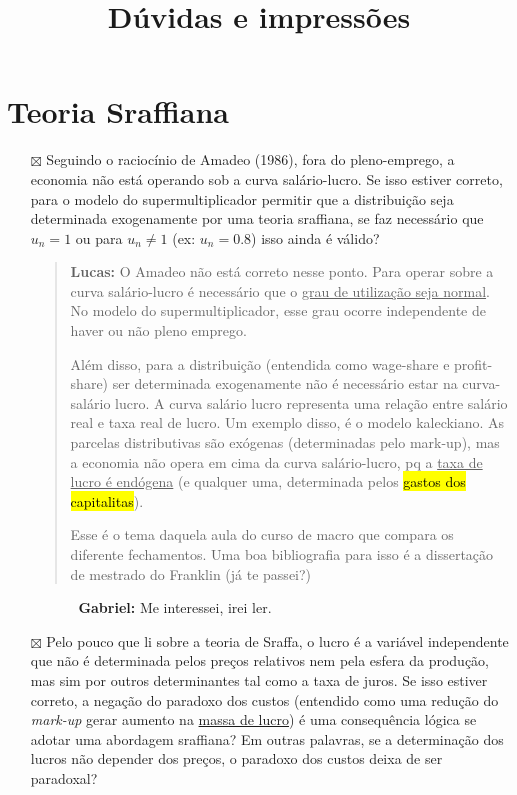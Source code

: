 \documentclass[]{article}
\title{Dúvidas e impressões}
\author{}
\date{}
\providecommand{\tightlist}{%
  \setlength{\itemsep}{0pt}\setlength{\parskip}{0pt}}
\begin{document}
\maketitle
\newcommand{\open}{$\square$}
\newcommand{\done}{$\boxtimes$}

{
\setcounter{tocdepth}{2}
\tableofcontents
}
\section{Teoria Sraffiana}\label{teoria-sraffiana}

\begin{itemize}
\tightlist
\item
  [\done] Seguindo o raciocínio de Amadeo (1986), fora do pleno-emprego,
  a economia não está operando sob a curva salário-lucro. Se isso
  estiver correto, para o modelo do supermultiplicador permitir que a
  distribuição seja determinada exogenamente por uma teoria sraffiana,
  se faz necessário que \(u_n = 1\) ou para \(u_n \neq 1\) (ex:
  \(u_n = 0.8\)) isso ainda é válido?

  \begin{quote}
    \textbf{Lucas:} O Amadeo não está correto nesse ponto. Para
    operar sobre a curva salário-lucro é necessário que o \underline{grau de
    utilização seja normal}. No modelo do supermultiplicador, esse grau
    ocorre independente de haver ou não pleno emprego.
    
    Além disso, para a distribuição (entendida como wage-share e profit-share) ser determinada exogenamente não é necessário estar na curva-salário lucro. A curva salário lucro representa uma relação entre salário real e taxa real de lucro.  Um exemplo disso, é o modelo kaleckiano. As parcelas distributivas são exógenas (determinadas pelo mark-up), mas a economia não opera em cima da curva salário-lucro, pq a \underline{taxa de lucro é endógena} (e qualquer uma, determinada pelos \hl{gastos dos capitalitas}). 
    
    Esse é o tema daquela aula do curso de macro que compara os diferente fechamentos. Uma boa bibliografia para isso é a dissertação de mestrado do Franklin (já te passei?)
    \end{quote}
    \begin{itemize}
     \item[]
        \begin{itemize}
        \item[] \textbf{Gabriel:} Me interessei, irei ler.
        \end{itemize}
    \end{itemize}
\item
  [\done] Pelo pouco que li sobre a teoria de Sraffa, o lucro é a
  variável independente que não é determinada pelos preços relativos nem
  pela esfera da produção, mas sim por outros determinantes tal como a
  taxa de juros. Se isso estiver correto, a negação do paradoxo dos
  custos (entendido como uma redução do \emph{mark-up} gerar aumento na \underline{massa de lucro}) é uma consequência lógica se adotar uma abordagem sraffiana?
  Em outras palavras, se a determinação dos lucros não depender dos
  preços, o paradoxo dos custos deixa de ser paradoxal?
\end{itemize}
\end{document}

